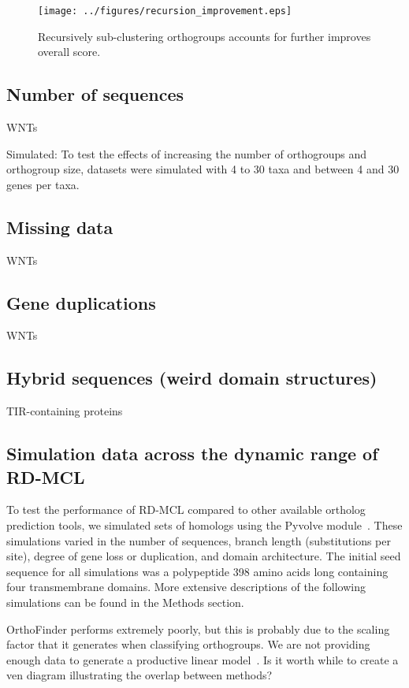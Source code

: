 \documentclass[twocolumn]{bmcart}  %
\begin{document}
\begin{figure}[t]
  \begin{center}
  \texttt{[image: ../figures/recursion\_improvement.eps]}
\end{center}
\caption{Recursively sub-clustering orthogroups accounts for further improves overall score. }
\label{fig:recursion_improvement}
\end{figure}


\subsection{Number of sequences}
WNTs

Simulated: To test the effects of increasing the number of orthogroups and orthogroup size, datasets were simulated with 4 to 30 taxa and between 4 and 30 genes per taxa.


\subsection{Missing data}
WNTs


\subsection{Gene duplications}
WNTs


\subsection{Hybrid sequences (weird domain structures)}
TIR-containing proteins


\subsection{Simulation data across the dynamic range of RD-MCL}\label{subsec:simulationDataAcrossTheDynamicRangeOfRd-mcl}
To test the performance of RD-MCL compared to other available ortholog prediction tools, we simulated sets of homologs using the Pyvolve module~\cite{Spielman:2015kv}.
These simulations varied in the number of sequences, branch length (substitutions per site), degree of gene loss or duplication, and domain architecture.
The initial seed sequence for all simulations was a polypeptide 398 amino acids long containing four transmembrane domains.
More extensive descriptions of the following simulations can be found in the Methods section.

OrthoFinder performs extremely poorly, but this is probably due to the scaling factor that it generates when classifying orthogroups.
We are not providing enough data to generate a productive linear model~\cite{Emms:2015ig}.
Is it worth while to create a ven diagram illustrating the overlap between methods?
\end{document}

